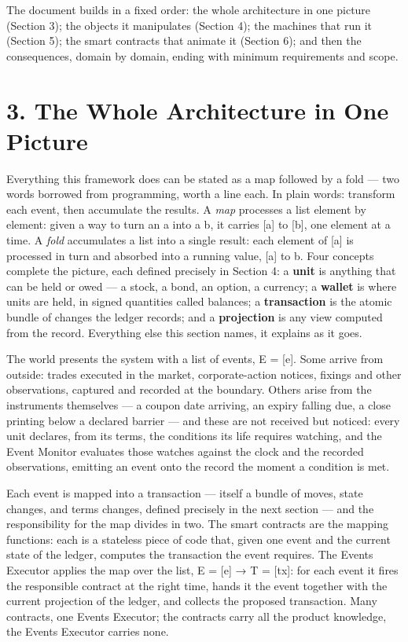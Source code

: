 \documentclass[11pt,a4paper]{article}
\newcommand{\clabel}[1]{\leavevmode\hypertarget{clause-#1}{}%
  \marginpar{\raggedright\scriptsize\ttfamily\textcolor{gray}{#1}}}
\begin{document}
The document builds in a fixed order: the whole architecture in one
picture (Section 3); the objects it manipulates (Section 4); the
machines that run it (Section 5); the smart contracts that animate it
(Section 6); and then the consequences, domain by domain, ending with
minimum requirements and scope.

\hypertarget{the-whole-architecture-in-one-picture}{%
\section{3. The Whole Architecture in One
Picture}\label{the-whole-architecture-in-one-picture}}

\clabel{C-3.1}Everything this framework does can be stated as a map followed by a fold
--- two words borrowed from programming, worth a line each. In plain
words: transform each event, then accumulate the results. A \emph{map}
processes a list element by element: given a way to turn an a into a b,
it carries {[}a{]} to {[}b{]}, one element at a time. A \emph{fold}
accumulates a list into a single result: each element of {[}a{]} is
processed in turn and absorbed into a running value, {[}a{]} to b. Four
concepts complete the picture, each defined precisely in Section 4: \clabel{C-3.2}a
\textbf{unit} is anything that can be held or owed --- a stock, a bond,
an option, a currency; a \textbf{wallet} is where units are held, in
signed quantities called balances; a \textbf{transaction} is the atomic
bundle of changes the ledger records; and a \textbf{projection} is any
view computed from the record. Everything else this section names, it
explains as it goes.

The world presents the system with a list of events, E = {[}e{]}. Some
arrive from outside: trades executed in the market, corporate-action
notices, fixings and other observations, captured and recorded at the
boundary. Others arise from the instruments themselves --- a coupon date
arriving, an expiry falling due, a close printing below a declared
barrier --- and these are not received but noticed: \clabel{C-3.3}every unit declares,
from its terms, the conditions its life requires watching, and the Event
Monitor evaluates those watches against the clock and the recorded
observations, emitting an event onto the record the moment a condition
is met.

Each event is mapped into a transaction --- itself a bundle of moves,
state changes, and terms changes, defined precisely in the next section
--- and the responsibility for the map divides in two. \clabel{C-3.4}The smart
contracts are the mapping functions: each is a stateless piece of code
that, given one event and the current state of the ledger, computes the
transaction the event requires. The Events Executor applies the map over
the list, E = {[}e{]} → T = {[}tx{]}: for each event it fires the
responsible contract at the right time, hands it the event together with
the current projection of the ledger, and collects the proposed
transaction. Many contracts, one Events Executor; the contracts carry
all the product knowledge, the Events Executor carries none.
\end{document}
